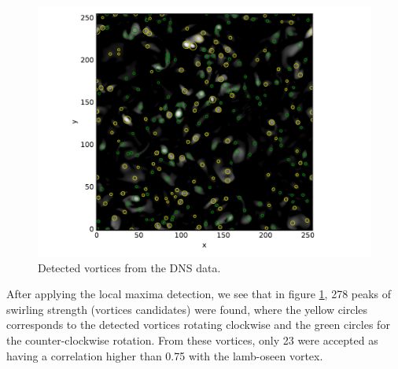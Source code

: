 \documentclass[12pt, a4paper, openany]{memoir}
\begin{document}
\begin{figure}[h]
	\centering
	\includegraphics[scale=0.6]{figure/dns_detect.pdf}
	\caption{Detected vortices from the DNS data.}
	\label{fig:detectionDNS}
\end{figure}

After applying the local maxima detection, we see that in figure \ref{fig:detectionDNS}, 278 peaks of swirling strength (vortices candidates) were found, where the yellow circles corresponds to the detected vortices rotating clockwise and the green circles for the counter-clockwise rotation. From these vortices, only 23 were accepted as having a correlation higher than 0.75 with the lamb-oseen vortex.
\end{document}
